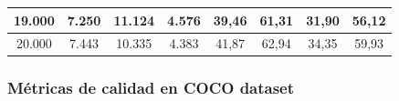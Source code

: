 \begin{table}[ht!]
\begin{tabular}{|c|c|c|c|c|c|c|c|}
19.000              & 7.250       & 11.124      & 4.576       & 39,46                                                             & 61,31                                                          & 31,90                                                               & 56,12                                                             \\ \hline
20.000              & 7.443       & 10.335      & 4.383       & 41,87                                                             & 62,94                                                          & 34,35                                                               & 59,93                                                             \\ \hline
\end{tabular}
\end{table}

\newpage

\subsubsection{Métricas de calidad en COCO dataset}
\label{subsubsec:metricas-calidad-coco}

